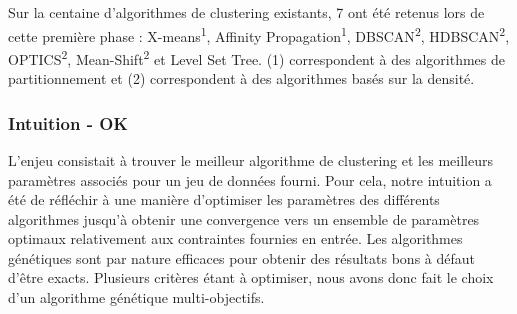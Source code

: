 \documentclass[draft]{llncs}
\begin{document}
Sur la centaine d'algorithmes de clustering existants, 7 ont été retenus lors de cette première phase : X-means\textsuperscript{1}, Affinity Propagation\textsuperscript{1}, DBSCAN\textsuperscript{2}, HDBSCAN\textsuperscript{2}, OPTICS\textsuperscript{2}, Mean-Shift\textsuperscript{2} et Level Set Tree. (1) correspondent à des algorithmes de partitionnement et (2) correspondent à des algorithmes basés sur la densité.








\subsubsection{Intuition - OK}

L'enjeu consistait à trouver le meilleur algorithme de clustering et les meilleurs paramètres associés pour un jeu de données fourni.
Pour cela, notre intuition a été de réfléchir à une manière d'optimiser les paramètres des différents algorithmes jusqu'à obtenir une convergence vers un ensemble de paramètres optimaux relativement aux contraintes fournies en entrée.
Les algorithmes génétiques sont par nature efficaces pour obtenir des résultats bons à défaut d'être exacts.
Plusieurs critères étant à optimiser, nous avons donc fait le choix d'un algorithme génétique multi-objectifs.
\end{document}
